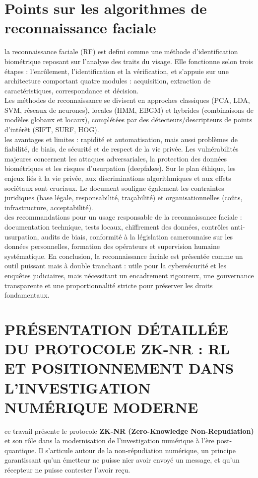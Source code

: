 \documentclass[12pt, a4em]{article}
\begin{document}
	\section{Points sur les algorithmes de reconnaissance faciale}
	

	 la reconnaissance faciale (RF) est defini comme une méthode d’identification biométrique reposant sur l’analyse des traits du visage. Elle fonctionne selon trois étapes : l’enrôlement, l’identification et la vérification, et s’appuie sur une architecture comportant quatre modules : acquisition, extraction de caractéristiques, correspondance et décision.\\
	 Les méthodes de reconnaissance se divisent en approches classiques (PCA, LDA, SVM, réseaux de neurones), locales (HMM, EBGM) et hybrides (combinaisons de modèles globaux et locaux), complétées par des détecteurs/descripteurs de points d’intérêt (SIFT, SURF, HOG).\\
	 les avantages et limites : rapidité et automatisation, mais aussi problèmes de fiabilité, de biais, de sécurité et de respect de la vie privée. Les vulnérabilités majeures concernent les attaques adversariales, la protection des données biométriques et les risques d’usurpation (deepfakes). Sur le plan éthique, les enjeux liés à la vie privée, aux discriminations algorithmiques et aux effets sociétaux sont cruciaux. Le document souligne également les contraintes juridiques (base légale, responsabilité, traçabilité) et organisationnelles (coûts, infrastructure, acceptabilité).\\
	 des recommandations pour un usage responsable de la reconnaissance faciale : documentation technique, tests locaux, chiffrement des données, contrôles anti-usurpation, audits de biais, conformité à la législation camerounaise sur les données personnelles, formation des opérateurs et supervision humaine systématique.
	 En conclusion, la reconnaissance faciale est présentée comme un outil puissant mais à double tranchant : utile pour la cybersécurité et les enquêtes judiciaires, mais nécessitant un encadrement rigoureux, une gouvernance transparente et une proportionnalité stricte pour préserver les droits fondamentaux.
	
	\section{\small{PRÉSENTATION DÉTAILLÉE DU PROTOCOLE ZK-NR : RL ET POSITIONNEMENT DANS L’INVESTIGATION NUMÉRIQUE MODERNE}}
	
	ce travail présente le protocole \textbf{ZK-NR (Zero-Knowledge Non-Repudiation)} et son rôle dans la modernisation de l’investigation numérique à l’ère post-quantique. Il s’articule autour de la non-répudiation numérique, un principe garantissant qu’un émetteur ne puisse nier avoir envoyé un message, et qu’un récepteur ne puisse contester l’avoir reçu.
	
\end{document}
